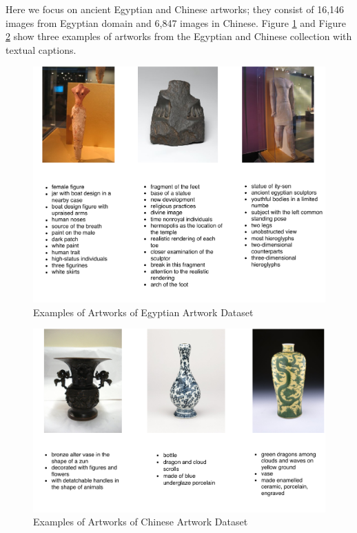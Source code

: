 
Here we focus on ancient Egyptian and Chinese artworks; 
they consist of 16,146 images from Egyptian domain and 6,847 images in Chinese. Figure \ref{fig:sampleEgyptian} and Figure \ref{fig:sampleChinese} show three examples of artworks from the Egyptian and Chinese collection with textual captions.

\begin{figure}[h!]
\centering
\includegraphics[width=.8\textwidth]{egyptian.pdf}
\caption{Examples of Artworks of Egyptian Artwork Dataset}
\label{fig:sampleEgyptian}
\end{figure}

\begin{figure}[h!]
\centering
\includegraphics[width=.9\textwidth]{chinese.pdf}
\caption{Examples of Artworks of Chinese Artwork Dataset}
\label{fig:sampleChinese}
\end{figure}

